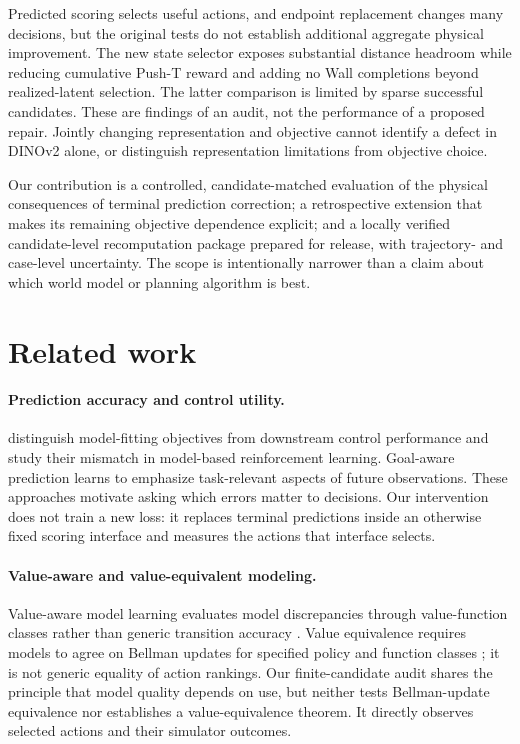 \documentclass{article}
\begin{document}
Predicted scoring selects useful actions, and endpoint replacement changes
many decisions, but the original tests do not establish additional aggregate
physical improvement. The new state selector exposes substantial distance
headroom while reducing cumulative Push-T reward and adding no Wall completions
beyond realized-latent selection. The latter comparison is limited by sparse successful
candidates. These are findings of an audit, not the performance of a proposed
repair. Jointly changing representation and objective cannot identify a defect
in DINOv2 alone, or distinguish representation limitations from objective choice.

Our contribution is a controlled, candidate-matched evaluation of the physical
consequences of terminal prediction correction; a retrospective extension that
makes its remaining objective dependence explicit; and a locally verified
candidate-level recomputation package prepared for release, with trajectory-
and case-level uncertainty. The
scope is intentionally narrower than a claim about which world model or
planning algorithm is best.

\section{Related work}

\paragraph{Prediction accuracy and control utility.}
\citet{pmlr-v120-lambert20a} distinguish model-fitting objectives from downstream
control performance and study their mismatch in model-based reinforcement
learning. Goal-aware prediction \citep{pmlr-v119-nair20a} learns to emphasize
task-relevant aspects of future observations. These approaches motivate asking
which errors matter to decisions. Our intervention does not train a new loss:
it replaces terminal predictions inside an otherwise fixed scoring interface
and measures the actions that interface selects.

\paragraph{Value-aware and value-equivalent modeling.}
Value-aware model learning evaluates model discrepancies through value-function
classes rather than generic transition accuracy \citep{pmlr-v54-farahmand17a}.
Value equivalence requires models to agree on Bellman updates for specified
policy and function classes \citep{grimm2020value}; it is not generic equality
of action rankings. Our finite-candidate audit shares the principle that model
quality depends on use, but neither tests Bellman-update equivalence nor
establishes a value-equivalence theorem. It directly observes selected actions
and their simulator outcomes.
\end{document}
